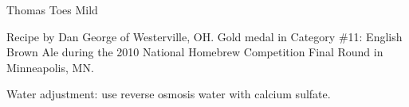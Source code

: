 \documentclass[parskip=half,fontsize=9pt,oneside]{scrbook}
\begin{document}
\mainmatter


\begin{recipe}{Thomas Toes Mild}

\begin{aboutblock}
Recipe by Dan George of Westerville, OH. Gold medal in Category \#11: English Brown
Ale during the 2010 National Homebrew Competition Final Round in Minneapolis, MN.
\sourceaha
\end{aboutblock}


\begin{methodandtiming}

\begin{mashsteps}
\end{mashsteps}

\begin{fermentationsteps}
\end{fermentationsteps}

\begin{directions}
Water adjustment: use reverse osmosis water with  calcium sulfate.
\end{directions}

\end{methodandtiming}

\recipebreak

\begin{ingredientsblock}

\begin{malts}
\end{malts}

\begin{hops}
\end{hops}


\end{ingredientsblock}

\end{recipe}


\end{document}
